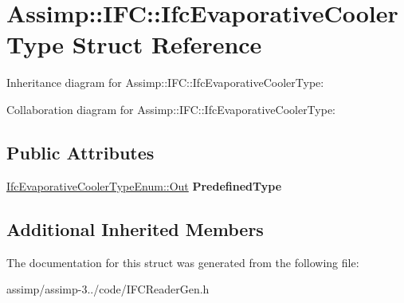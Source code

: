 \hypertarget{struct_assimp_1_1_i_f_c_1_1_ifc_evaporative_cooler_type}{\section{Assimp\+:\+:I\+F\+C\+:\+:Ifc\+Evaporative\+Cooler\+Type Struct Reference}
\label{struct_assimp_1_1_i_f_c_1_1_ifc_evaporative_cooler_type}
}


Inheritance diagram for Assimp\+:\+:I\+F\+C\+:\+:Ifc\+Evaporative\+Cooler\+Type\+:


Collaboration diagram for Assimp\+:\+:I\+F\+C\+:\+:Ifc\+Evaporative\+Cooler\+Type\+:
\subsection*{Public Attributes}
\begin{DoxyCompactItemize}
\item 
\hypertarget{struct_assimp_1_1_i_f_c_1_1_ifc_evaporative_cooler_type_a29ddbf98869fc77c34a82b34085c88ea}{\hyperlink{classboost_1_1shared__ptr}{Ifc\+Evaporative\+Cooler\+Type\+Enum\+::\+Out} {\bfseries Predefined\+Type}}\label{struct_assimp_1_1_i_f_c_1_1_ifc_evaporative_cooler_type_a29ddbf98869fc77c34a82b34085c88ea}

\end{DoxyCompactItemize}
\subsection*{Additional Inherited Members}


The documentation for this struct was generated from the following file\+:\begin{DoxyCompactItemize}
\item 
assimp/assimp-\/3../code/I\+F\+C\+Reader\+Gen.\+h\end{DoxyCompactItemize}
